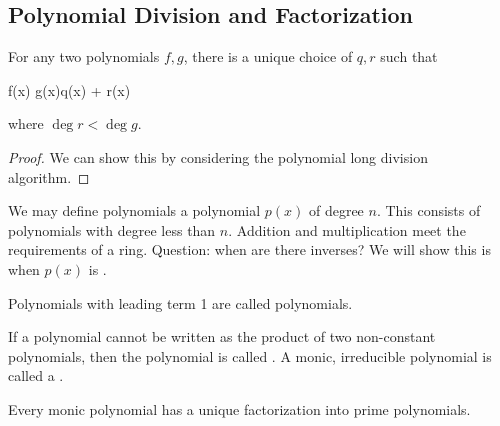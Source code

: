 \subsection{Polynomial Division and Factorization}

\begin{theorem}
  For any two polynomials $f, g$, there is a unique choice of $q, r$
  such that

  \begin{nedqn}
    f(x)
  \eqcol
    g(x)q(x) + r(x)
  \end{nedqn}

  \noindent
  where $\deg r < \deg g$.
\end{theorem}

\begin{proof}
  We can show this by considering the polynomial long division
  algorithm.
\end{proof}

\begin{definition}
  We may define polynomials  a polynomial $p(x)$ of
  degree $n$. This consists of polynomials with degree less than $n$.
  Addition and multiplication meet the requirements of a ring. Question:
  when are there inverses? We will show this is when $p(x)$ is
  .
\end{definition}

\begin{definition}
  Polynomials with leading term 1 are called  polynomials.

  If a polynomial cannot be written as the product of two non-constant
  polynomials, then the polynomial is called . A
  monic, irreducible polynomial is called a .
\end{definition}

\begin{proposition}
  Every monic polynomial has a unique factorization into prime
  polynomials.
\end{proposition}

